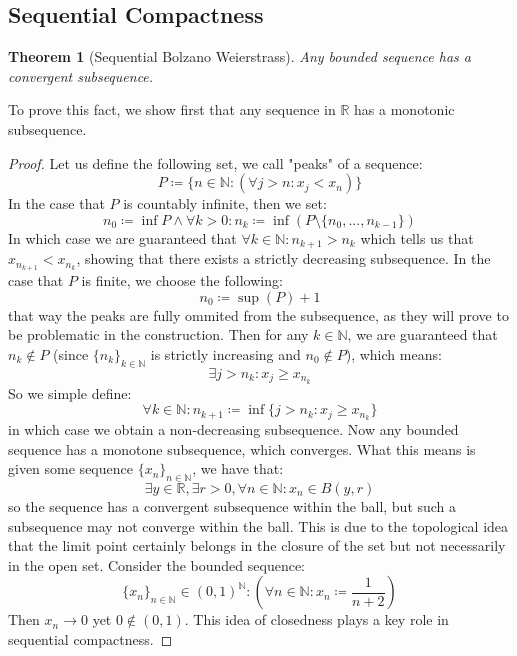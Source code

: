 \documentclass[10pt,letterpaper]{article} %
\newtheorem{thm}{Theorem}[section]
\begin{document}
\subsection{Sequential Compactness}
\begin{thm}[Sequential Bolzano Weierstrass]
Any bounded sequence has a convergent subsequence.
\end{thm}
To prove this fact, we show first that any sequence in $\mathbb{R}$ has a monotonic subsequence. 
\begin{proof}
Let us define the following set, we call "peaks" of a sequence:
\begin{equation*}
P \coloneq \{n \in \mathbb{N}: (\forall j > n: x_j < x_n)\}
\end{equation*}
In the case that $P$ is countably infinite, then we set:
\begin{equation*}
n_0 \coloneq \inf P \land \forall k > 0: n_k \coloneq \inf \left(P \setminus \{n_0,...,n_{k-1}\}\right)
\end{equation*}
In which case we are guaranteed that $\forall k \in \mathbb{N}: n_{k+1} > n_k$ which tells us that $x_{n_{k+1}} < x_{n_k}$, showing that there exists a strictly decreasing subsequence. In the case that $P$ is finite, we choose the following:
\begin{equation*}
n_0 \coloneq \sup(P) + 1
\end{equation*}
that way the peaks are fully ommited from the subsequence, as they will prove to be problematic in the construction. Then for any $k \in \mathbb{N}$, we are guaranteed that $n_k \notin P$ (since $\{n_k\}_{k \in \mathbb{N}}$ is strictly increasing and $n_0 \notin P$), which means:
\begin{equation*}
\exists j > n_k: x_j \geqslant x_{n_k}
\end{equation*}
So we simple define:
\begin{equation*}
\forall k \in \mathbb{N}: n_{k+1} \coloneq \inf\{j > n_k: x_j \geqslant x_{n_k}\}
\end{equation*}
in which case we obtain a non-decreasing subsequence. Now any bounded sequence has a monotone subsequence, which converges. What this means is given some sequence $\{x_n\}_{n \in \mathbb{N}}$, we have that:
\begin{equation*}
\exists y \in \mathbb{R}, \exists r > 0, \forall n \in \mathbb{N}: x_n \in B(y, r)
\end{equation*}
so the sequence has a convergent subsequence within the ball, but such a subsequence may not converge within the ball. This is due to the topological idea that the limit point certainly belongs in the closure of the set but not necessarily in the open set. Consider the bounded sequence:
\begin{equation*}
\{x_n\}_{n \in \mathbb{N}} \in (0, 1)^\mathbb{N}: \left(\forall n \in \mathbb{N}: x_n \coloneq \frac{1}{n+2}\right)
\end{equation*}
Then $x_n \xrightarrow{} 0$ yet $0 \notin (0, 1)$. This idea of closedness plays a key role in sequential compactness. 
\end{proof}
\end{document}
